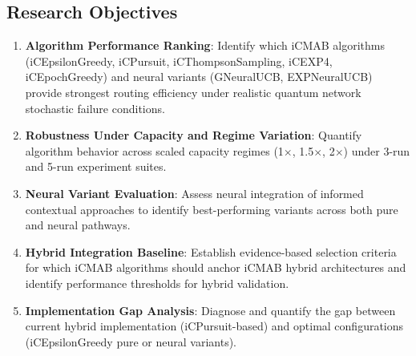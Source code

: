 \documentclass[12pt,a4paper]{article}
\begin{document}
\subsection{Research Objectives}
\begin{enumerate}
\item \textbf{Algorithm Performance Ranking}: Identify which iCMAB algorithms (iCEpsilonGreedy, iCPursuit, iCThompsonSampling, iCEXP4, iCEpochGreedy) and neural variants (GNeuralUCB, EXPNeuralUCB) provide strongest routing efficiency under realistic quantum network stochastic failure conditions.
\item \textbf{Robustness Under Capacity and Regime Variation}: Quantify algorithm behavior across scaled capacity regimes (1$\times$, 1.5$\times$, 2$\times$) under 3-run and 5-run experiment suites.
\item \textbf{Neural Variant Evaluation}: Assess neural integration of informed contextual approaches to identify best-performing variants across both pure and neural pathways.
\item \textbf{Hybrid Integration Baseline}: Establish evidence-based selection criteria for which iCMAB algorithms should anchor iCMAB hybrid architectures and identify performance thresholds for hybrid validation.
\item \textbf{Implementation Gap Analysis}: Diagnose and quantify the gap between current hybrid implementation (iCPursuit-based) and optimal configurations (iCEpsilonGreedy pure or neural variants).
\end{enumerate}
\end{document}

